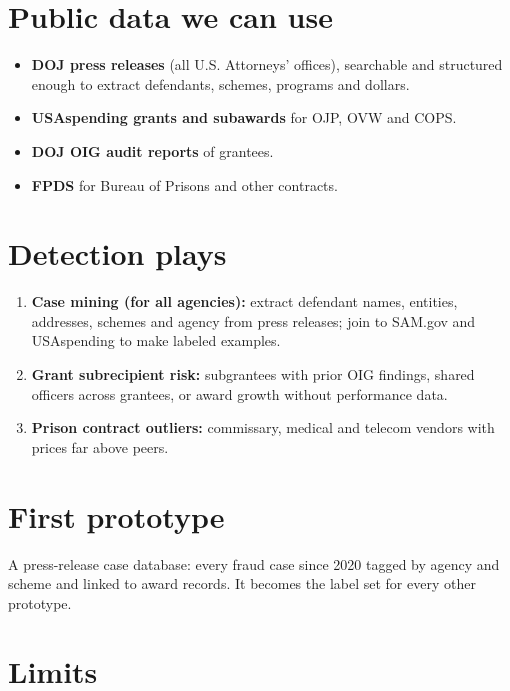 \documentclass[letterpaper,11pt]{article}
\providecommand{\tightlist}{\setlength{\itemsep}{0pt}\setlength{\parskip}{0pt}}
\begin{document}
\hypertarget{public-data-we-can-use}{%
\section{Public data we can use}\label{public-data-we-can-use}}

\begin{itemize}
\tightlist
\item
  \textbf{DOJ press releases} (all U.S. Attorneys' offices), searchable
  and structured enough to extract defendants, schemes, programs and
  dollars.
\item
  \textbf{USAspending grants and subawards} for OJP, OVW and COPS.
\item
  \textbf{DOJ OIG audit reports} of grantees.
\item
  \textbf{FPDS} for Bureau of Prisons and other contracts.
\end{itemize}

\hypertarget{detection-plays}{%
\section{Detection plays}\label{detection-plays}}

\begin{enumerate}
\def\labelenumi{\arabic{enumi}.}
\tightlist
\item
  \textbf{Case mining (for all agencies):} extract defendant names,
  entities, addresses, schemes and agency from press releases; join to
  SAM.gov and USAspending to make labeled examples.
\item
  \textbf{Grant subrecipient risk:} subgrantees with prior OIG findings,
  shared officers across grantees, or award growth without performance
  data.
\item
  \textbf{Prison contract outliers:} commissary, medical and telecom
  vendors with prices far above peers.
\end{enumerate}

\hypertarget{first-prototype}{%
\section{First prototype}\label{first-prototype}}

A press-release case database: every fraud case since 2020 tagged by
agency and scheme and linked to award records. It becomes the label set
for every other prototype.

\hypertarget{limits}{%
\section{Limits}\label{limits}}
\end{document}
